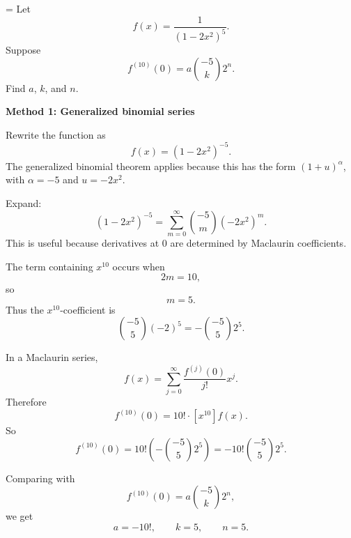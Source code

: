 \documentclass[a4paper,12pt,twocolumn]{article}
\newlength{\problemnumberwidth}
\newenvironment{solutionbox}{\begin{framed}}{\end{framed}}
\newcommand{\problem}[3]{%
  \Needspace{10\baselineskip}%
  \phantomsection\label{#1}%
  \par\vspace{0.8em}%
  \noindent
  \hangindent=\problemnumberwidth
  \hangafter=1
  \makebox[\problemnumberwidth][l]{\textbf{#2.}}#3\par
}
\begin{document}
\problem{prob:4}{4}{Let
\[
f(x)=\frac{1}{(1-2x^2)^5}.
\]
Suppose
\[
f^{(10)}(0)=a\binom{-5}{k}2^n.
\]
Find \(a\), \(k\), and \(n\).}

\begin{solutionbox}
\textbf{Method 1: Generalized binomial series}

\begin{steps}
\item Rewrite the function as
\[
f(x)=(1-2x^2)^{-5}.
\]
The generalized binomial theorem applies because this has the form \((1+u)^\alpha\), with \(\alpha=-5\) and \(u=-2x^2\).

\item Expand:
\[
(1-2x^2)^{-5}
=\sum_{m=0}^{\infty}\binom{-5}{m}(-2x^2)^m.
\]
This is useful because derivatives at \(0\) are determined by Maclaurin coefficients.

\item The term containing \(x^{10}\) occurs when
\[
2m=10,
\]
so
\[
m=5.
\]
Thus the \(x^{10}\)-coefficient is
\[
\binom{-5}{5}(-2)^5
=-\binom{-5}{5}2^5.
\]

\item In a Maclaurin series,
\[
f(x)=\sum_{j=0}^{\infty}\frac{f^{(j)}(0)}{j!}x^j.
\]
Therefore
\[
f^{(10)}(0)=10!\cdot [x^{10}]f(x).
\]
So
\[
f^{(10)}(0)
=10!\left(-\binom{-5}{5}2^5\right)
=-10!\binom{-5}{5}2^5.
\]

\item Comparing with
\[
f^{(10)}(0)=a\binom{-5}{k}2^n,
\]
we get
\[
a=-10!,\qquad k=5,\qquad n=5.
\]
\end{steps}
\end{solutionbox}
\end{document}
